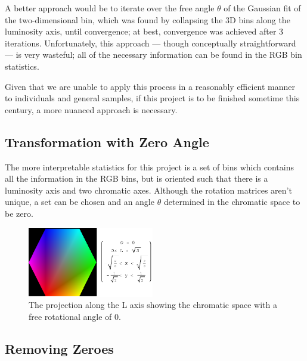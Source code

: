 A better approach would be to iterate over the free angle $\theta$ of the Gaussian fit of the two-dimensional bin, which was found by collapsing the 3D bins along the luminosity axis, until convergence; at best, convergence was achieved after 3 iterations. Unfortunately, this approach --- though conceptually straightforward --- is very wasteful; all of the necessary information can be found in the RGB bin statistics.

Given that we are unable to apply this process in a reasonably efficient manner to individuals and general samples, if this project is to be finished sometime this century, a more nuanced approach is necessary.

\subsection{Transformation with Zero Angle}\label{sec:TransWithZeroAngle}

The more interpretable statistics for this project is a set of bins which contains all the information in the RGB bins, but is oriented such that there is a luminosity axis and two chromatic axes. Although the rotation matrices aren't unique, a set can be chosen and an angle $\theta$ determined in the chromatic space to be zero.

\begin{figure}[h!]
  \centering
    \includegraphics[width=0.49\textwidth]{Chapter3/Figs/xy_Polygon.eps}
    \caption{The projection along the L axis showing the chromatic space with a free rotational angle of 0.}  \label{fig:xyPolygon}
\end{figure}



\subsection{Removing Zeroes}\label{sec:RemovingZeroes}

